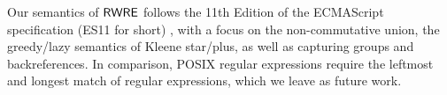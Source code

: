 \begin{remark}
Our semantics of ${\sf RWRE}$ follows the 11th Edition of the ECMAScript specification (ES11 for short) \cite{ECMAScript11}, with a focus on the non-commutative union, the greedy/lazy semantics of Kleene star/plus, as well as capturing groups and backreferences.
In comparison, POSIX regular expressions require the leftmost and longest match of regular expressions, which we leave as future work.
\end{remark}
  
  
  
%  
